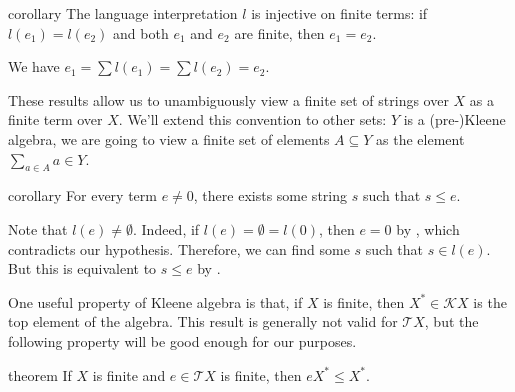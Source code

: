 \documentclass[11pt,a4paper]{amsart}
\theoremstyle{definition}
\begin{document}
\begin{theoremEnd}{corollary}
  \label{thm:finiteness-injective}
  The language interpretation $l$ is injective on finite terms: if $l(e_{1}) =
  l(e_{2})$ and both \(e_1\) and \(e_2\) are finite, then $e_{1} = e_{2}$.
\end{theoremEnd}

\begin{proofEnd}
  We have $e_{1} =  \sum l(e_{1}) =  \sum l(e_{2}) = e_{2}$.
\end{proofEnd}

These results allow us to unambiguously view a finite set of strings over $X$ as
a finite term over $X$.  We'll extend this convention to other sets: $Y$ is a
(pre-)Kleene algebra, we are going to view a finite set of elements $A  \subseteq  Y$ as
the element $ \sum _{a  \in  A} a  \in  Y$.

\begin{theoremEnd}{corollary}
  \label{thm:emptiness-characterization}
  For every term $e  \neq  0$, there exists some string $s$ such that $s  \leq  e$.
\end{theoremEnd}

\begin{proofEnd}
  Note that $l(e)  \neq   \emptyset $.  Indeed, if $l(e) =  \emptyset  = l(0)$, then $e = 0$ by
  , which contradicts our hypothesis.  Therefore,
  we can find some $s$ such that $s  \in  l(e)$.  But this is equivalent to $s  \leq  e$
  by .
\end{proofEnd}

One useful property of Kleene algebra is that, if $X$ is finite, then
$X^*  \in  \mathcal{K}X$ is the top element of the algebra.  This result is
generally not valid for $\mathcal{T}X$, but the following property will be good
enough for our purposes.

\begin{theoremEnd}[normal]{theorem}
  If $X$ is finite and $e  \in  \mathcal{T}X$ is finite, then $eX^*  \leq  X^*$.
\end{theoremEnd}
\end{document}

